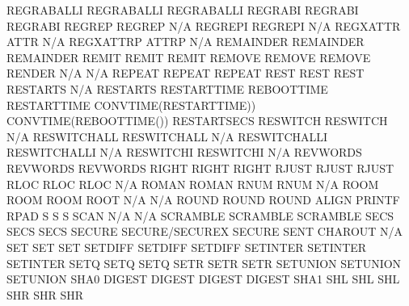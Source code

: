 \documentclass[letterpaper,10pt,english]{sphinxmanual}
\begin{document}
\begin{description}
REGRABALLI              REGRABALLI                   REGRABALLI
REGRABI                 REGRABI                      REGRABI
REGREP                  REGREP                       N/A
REGREPI                 REGREPI                      N/A
REGXATTR                ATTR                         N/A
REGXATTRP               ATTRP                        N/A
REMAINDER               REMAINDER                    REMAINDER
REMIT                   REMIT                        REMIT
REMOVE                  REMOVE                       REMOVE
RENDER                  N/A                          N/A
REPEAT                  REPEAT                       REPEAT
REST                    REST                         REST
RESTARTS                N/A                          RESTARTS
RESTARTTIME             REBOOTTIME                   RESTARTTIME
CONVTIME(RESTARTTIME))  CONVTIME(REBOOTTIME())       RESTARTSECS
RESWITCH                RESWITCH                     N/A
RESWITCHALL             RESWITCHALL                  N/A
RESWITCHALLI            RESWITCHALLI                 N/A
RESWITCHI               RESWITCHI                    N/A
REVWORDS                REVWORDS                     REVWORDS
RIGHT                   RIGHT                        RIGHT
RJUST                   RJUST                        RJUST
RLOC                    RLOC                         RLOC
N/A                     ROMAN                        ROMAN
RNUM                    RNUM                         N/A
ROOM                    ROOM                         ROOM
ROOT                    N/A                          N/A
ROUND                   ROUND                        ROUND
ALIGN                   PRINTF                       RPAD
S                       S                            S
SCAN                    N/A                          N/A
SCRAMBLE                SCRAMBLE                     SCRAMBLE
SECS                    SECS                         SECS
SECURE                  SECURE/SECUREX               SECURE
SENT                    CHAROUT                      N/A
SET                     SET                          SET
SETDIFF                 SETDIFF                      SETDIFF
SETINTER                SETINTER                     SETINTER
SETQ                    SETQ                         SETQ
SETR                    SETR                         SETR
SETUNION                SETUNION                     SETUNION
SHA0                    DIGEST                       DIGEST
DIGEST                  DIGEST                       SHA1
SHL                     SHL                          SHL
SHR                     SHR                          SHR

\end{description}
\end{document}
